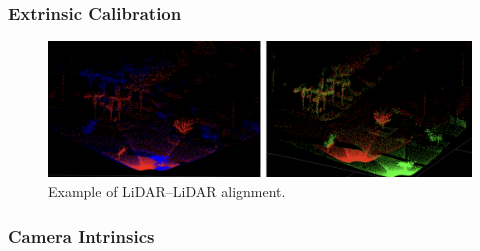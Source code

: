 \documentclass{erauthesis}
\begin{document}
\subsubsection{Extrinsic Calibration} \label{extrinsic_tform}


\begin{figure}[htbp]
    \centering
    \includegraphics[width=0.9\linewidth]{Images/Lidar2Lidar.png}
    \caption{Example of LiDAR–LiDAR alignment.}
    \label{fig:Lidar2Lidar}
\end{figure}

\subsubsection{Camera Intrinsics} \label{camera_intrinsics}

\end{document}
